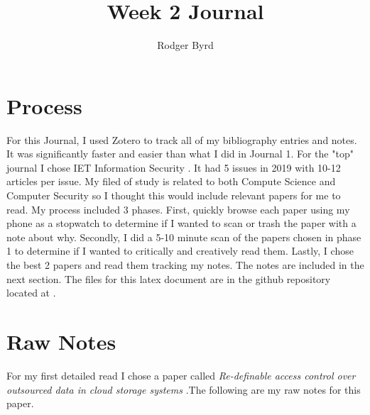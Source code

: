 \documentclass[conference]{IEEEtran}
\begin{document}

\title{Week 2 Journal}
\author{Rodger Byrd}
\maketitle


\section{Process}

For this Journal, I used Zotero to track all of my bibliography entries and notes. It was significantly faster and easier than what I did in Journal 1. 
For the "top" journal I chose IET Information Security \cite{noauthor_iet_nodate}. It had 5 issues in 2019 with 10-12 articles per issue. My filed of study is related to both Compute Science and Computer Security so I thought this would include relevant papers for me to read. My process included 3 phases. 
First, quickly browse each paper using my phone as a stopwatch to determine if I wanted to scan or trash the paper with a note about why.
Secondly, I did a 5-10 minute scan of the papers chosen in phase 1 to determine if I wanted to critically and creatively read them.
Lastly, I chose the best 2 papers and read them tracking my notes. The notes are included in the next section. 
The files for this latex document are in the github repository located at .

\section{Raw Notes}
For my first detailed read I chose a paper called  \textit{Re-definable access control over outsourced data in cloud storage systems} \cite{zhang_re-definable_2019}.The following are my raw notes for this paper.
\end{document}
